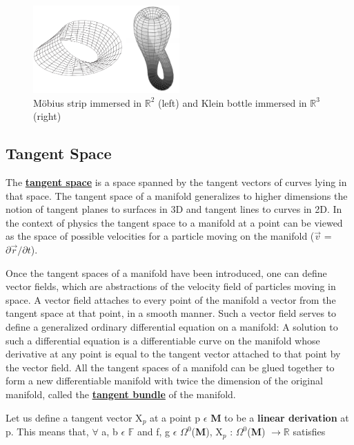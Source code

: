 \begin{figure}[h]
    \begin{center}
        \includegraphics[width=0.5\textwidth]{figures/moebius-klien.png}
        \caption{Möbius strip immersed in $\mathbb{R}^{2}$ (left) and Klein bottle immersed in $\mathbb{R}^{3}$ (right)}
    \end{center}
\end{figure}

\subsection{Tangent Space}\label{Tangent Space}
The \href{https://en.wikipedia.org/wiki/Tangent_space}{\textbf{tangent space}} is a space spanned by
the tangent vectors of curves lying in that space. The tangent space of a manifold generalizes to higher dimensions 
the notion of tangent planes to surfaces in 3D and tangent lines to curves in 2D. 
In the context of physics the tangent space to a manifold at a point can be viewed as the space of possible velocities 
for a particle moving on the manifold ($\overrightarrow{v}$ = $\partial \overrightarrow{r}/ \partial t$).

Once the tangent spaces of a manifold have been introduced, one can define vector fields, which are abstractions of the velocity field of particles moving in space. 
A vector field attaches to every point of the manifold a vector from the tangent space at that point, in a smooth manner. 
Such a vector field serves to define a generalized ordinary differential equation on a manifold: 
A solution to such a differential equation is a differentiable curve on the manifold whose derivative at any point is equal to the 
tangent vector attached to that point by the vector field. 
All the tangent spaces of a manifold can be glued together to form a new differentiable manifold
with twice the dimension of the original manifold, called the \href{https://en.wikipedia.org/wiki/Tangent_bundle}{\textbf{tangent bundle}}
of the manifold.

Let us define a tangent vector X$_p$ at a point p $\epsilon$ \textbf{M} to be a \textbf{linear derivation} at p. 
This means that, $\forall$ a, b $\epsilon$ $\mathbb{F}$ and
f, g $\epsilon$ $\Omega^0$(\textbf{M}), X$_p$ : $\Omega^0$(\textbf{M}) $\rightarrow \mathbb{R}$ satisfies

